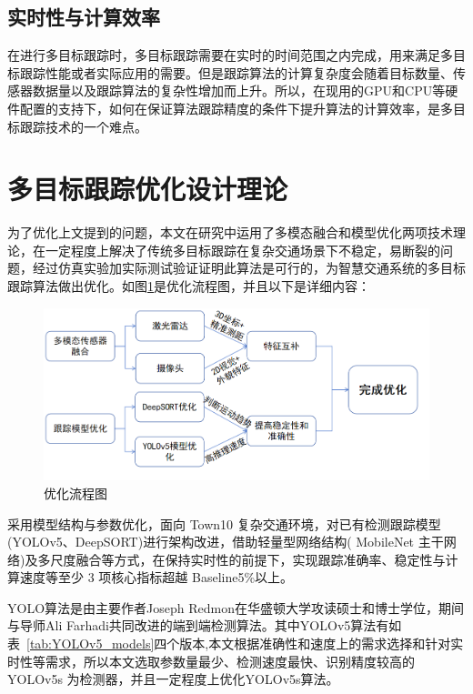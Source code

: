 \subsection{实时性与计算效率}
在进行多目标跟踪时，多目标跟踪需要在实时的时间范围之内完成，用来满足多目标跟踪性能或者实际应用的需要。但是跟踪算法的计算复杂度会随着目标数量、传感器数据量以及跟踪算法的复杂性增加而上升。所以，在现用的GPU和CPU等硬件配置的支持下，如何在保证算法跟踪精度的条件下提升算法的计算效率，是多目标跟踪技术的一个难点。



\section{多目标跟踪优化设计理论}
为了优化上文提到的问题，本文在研究中运用了多模态融合和模型优化两项技术理论，在一定程度上解决了传统多目标跟踪在复杂交通场景下不稳定，易断裂的问题，经过仿真实验加实际测试验证证明此算法是可行的，为智慧交通系统的多目标跟踪算法做出优化。如图\ref{fig:np2}是优化流程图，并且以下是详细内容：



\begin{figure}[htbp] %
	\centering
	\includegraphics[width=1\textwidth]{np2} %
	\caption{优化流程图} %
	\label{fig:np2} %
\end{figure}







采用模型结构与参数优化，面向 Town10 复杂交通环境，对已有检测跟踪模型(YOLOv5、DeepSORT)进行架构改进，借助轻量型网络结构( MobileNet 主干网络)及多尺度融合等方式，在保持实时性的前提下，实现跟踪准确率、稳定性与计算速度等至少 3 项核心指标超越 Baseline5\%以上。

YOLO算法是由主要作者Joseph Redmon在华盛顿大学攻读硕士和博士学位，期间与导师Ali Farhadi共同改进的端到端检测算法。其中YOLOv5算法有如表~\ref{tab:YOLOv5_models}四个版本,本文根据准确性和速度上的需求选择和针对实时性等需求，所以本文选取参数量最少、检测速度最快、识别精度较高的 YOLOv5s 为检测器，并且一定程度上优化YOLOv5s算法。




